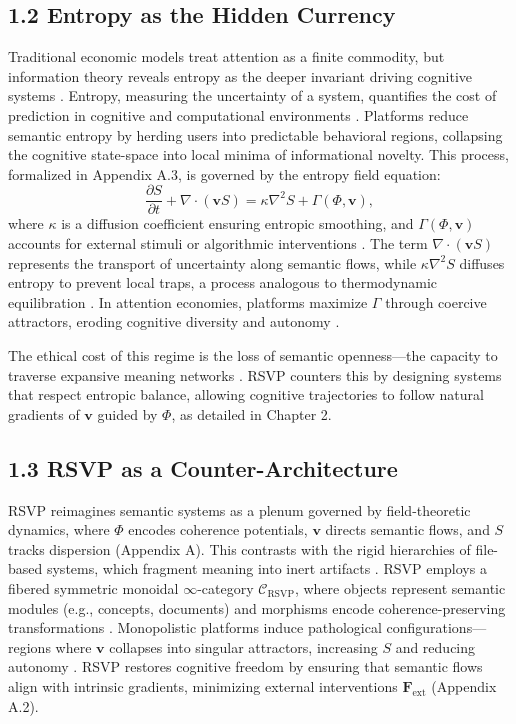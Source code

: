 \documentclass[12pt]{article}
\begin{document}
\subsection{1.2 Entropy as the Hidden Currency}

Traditional economic models treat attention as a finite commodity, but information theory reveals entropy as the deeper invariant driving cognitive systems \citep{shannon1948, cover2006}. Entropy, measuring the uncertainty of a system, quantifies the cost of prediction in cognitive and computational environments \citep{jaynes2003}. Platforms reduce semantic entropy by herding users into predictable behavioral regions, collapsing the cognitive state-space into local minima of informational novelty. This process, formalized in Appendix A.3, is governed by the entropy field equation:
\[
\frac{\partial S}{\partial t} + \nabla \cdot (\mathbf{v} S) = \kappa \nabla^2 S + \Gamma(\Phi, \mathbf{v}),
\]
where \(\kappa\) is a diffusion coefficient ensuring entropic smoothing, and \(\Gamma(\Phi, \mathbf{v})\) accounts for external stimuli or algorithmic interventions \citep{shannon1948}. The term \(\nabla \cdot (\mathbf{v} S)\) represents the transport of uncertainty along semantic flows, while \(\kappa \nabla^2 S\) diffuses entropy to prevent local traps, a process analogous to thermodynamic equilibration \citep{jaynes2003}. In attention economies, platforms maximize \(\Gamma\) through coercive attractors, eroding cognitive diversity and autonomy \citep{deleuze1987}.

The ethical cost of this regime is the loss of semantic openness—the capacity to traverse expansive meaning networks \citep{ortega1957}. RSVP counters this by designing systems that respect entropic balance, allowing cognitive trajectories to follow natural gradients of \(\mathbf{v}\) guided by \(\Phi\), as detailed in Chapter 2.

\subsection{1.3 RSVP as a Counter-Architecture}

RSVP reimagines semantic systems as a plenum governed by field-theoretic dynamics, where \(\Phi\) encodes coherence potentials, \(\mathbf{v}\) directs semantic flows, and \(S\) tracks dispersion (Appendix A). This contrasts with the rigid hierarchies of file-based systems, which fragment meaning into inert artifacts \citep{bird1988}. RSVP employs a fibered symmetric monoidal \(\infty\)-category \(\mathcal{C}_{\text{RSVP}}\), where objects represent semantic modules (e.g., concepts, documents) and morphisms encode coherence-preserving transformations \citep{maclane1998, lawvere2009}. Monopolistic platforms induce pathological configurations—regions where \(\mathbf{v}\) collapses into singular attractors, increasing \(S\) and reducing autonomy \citep{deleuze1987}. RSVP restores cognitive freedom by ensuring that semantic flows align with intrinsic gradients, minimizing external interventions \(\mathbf{F}_{\text{ext}}\) (Appendix A.2).
\end{document}
